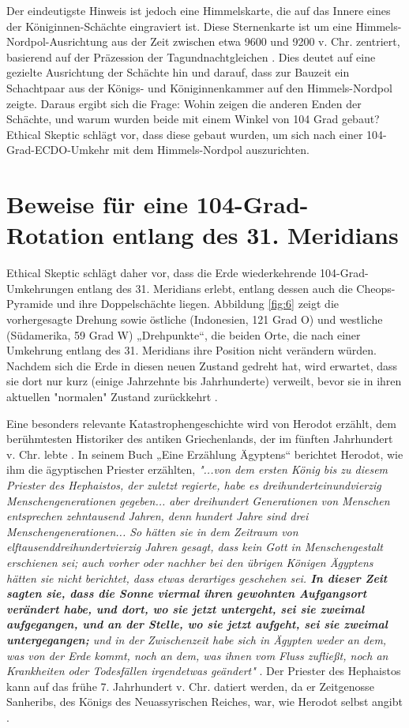 \documentclass[10pt,twocolumn,letterpaper]{article}
\begin{document}
Der eindeutigste Hinweis ist jedoch eine Himmelskarte, die auf das Innere eines der Königinnen-Schächte eingraviert ist. Diese Sternenkarte ist um eine Himmels-Nordpol-Ausrichtung aus der Zeit zwischen etwa 9600 und 9200 v. Chr. zentriert, basierend auf der Präzession der Tagundnachtgleichen \cite{28}. Dies deutet auf eine gezielte Ausrichtung der Schächte hin und darauf, dass zur Bauzeit ein Schachtpaar aus der Königs- und Königinnenkammer auf den Himmels-Nordpol zeigte. Daraus ergibt sich die Frage: Wohin zeigen die anderen Enden der Schächte, und warum wurden beide mit einem Winkel von 104 Grad gebaut? Ethical Skeptic schlägt vor, dass diese gebaut wurden, um sich nach einer 104-Grad-ECDO-Umkehr mit dem Himmels-Nordpol auszurichten.

\section{Beweise für eine 104-Grad-Rotation entlang des 31. Meridians}

Ethical Skeptic schlägt daher vor, dass die Erde wiederkehrende 104-Grad-Umkehrungen entlang des 31. Meridians erlebt, entlang dessen auch die Cheops-Pyramide und ihre Doppelschächte liegen. Abbildung \ref{fig:6} zeigt die vorhergesagte Drehung sowie östliche (Indonesien, 121 Grad O) und westliche (Südamerika, 59 Grad W) „Drehpunkte“, die beiden Orte, die nach einer Umkehrung entlang des 31. Meridians ihre Position nicht verändern würden. Nachdem sich die Erde in diesen neuen Zustand gedreht hat, wird erwartet, dass sie dort nur kurz (einige Jahrzehnte bis Jahrhunderte) verweilt, bevor sie in ihren aktuellen "normalen" Zustand zurückkehrt \cite{150}.

Eine besonders relevante Katastrophengeschichte wird von Herodot erzählt, dem berühmtesten Historiker des antiken Griechenlands, der im fünften Jahrhundert v. Chr. lebte \cite{31}. In seinem Buch „Eine Erzählung Ägyptens“ berichtet Herodot, wie ihm die ägyptischen Priester erzählten, \textit{"...von dem ersten König bis zu diesem Priester des Hephaistos, der zuletzt regierte, habe es dreihunderteinundvierzig Menschengenerationen gegeben... aber dreihundert Generationen von Menschen entsprechen zehntausend Jahren, denn hundert Jahre sind drei Menschengenerationen... So hätten sie in dem Zeitraum von elftausenddreihundertvierzig Jahren gesagt, dass kein Gott in Menschengestalt erschienen sei; auch vorher oder nachher bei den übrigen Königen Ägyptens hätten sie nicht berichtet, dass etwas derartiges geschehen sei. \textbf{In dieser Zeit sagten sie, dass die Sonne viermal ihren gewohnten Aufgangsort verändert habe, und dort, wo sie jetzt untergeht, sei sie zweimal aufgegangen, und an der Stelle, wo sie jetzt aufgeht, sei sie zweimal untergegangen;} und in der Zwischenzeit habe sich in Ägypten weder an dem, was von der Erde kommt, noch an dem, was ihnen vom Fluss zufließt, noch an Krankheiten oder Todesfällen irgendetwas geändert"} \cite{32}. Der Priester des Hephaistos kann auf das frühe 7. Jahrhundert v. Chr. datiert werden, da er Zeitgenosse Sanheribs, des Königs des Neuassyrischen Reiches, war, wie Herodot selbst angibt \cite{32,33,34}.
\end{document}
